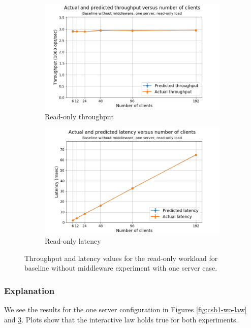 \documentclass[11pt,a4paper]{article}
\begin{document}
\begin{figure}[h]
\centering
\begin{subfigure}{.5\textwidth}
  \centering
  \includegraphics[width=1.0\linewidth,trim={20px 0px 35px 0px},clip]{img/plot/csb1-ro-law_tpt.png}
  \caption{Read-only throughput}
  \label{fig:csb1-ro-law_tpt}
\end{subfigure}%
\begin{subfigure}{.5\textwidth}
  \centering
  \includegraphics[width=1.0\linewidth,trim={20px 0px 40px 0px},clip]{img/plot/csb1-ro-law_lat.png}
  \caption{Read-only latency}
  \label{fig:csb1-ro-law_lat}
\end{subfigure}
\caption{Throughput and latency values for the read-only workload for baseline without middleware experiment with one server case.}
\label{fig:csb1-ro-law}
\end{figure}

\subsubsection{Explanation} \label{sec:csb1-exp}
We see the results for the one server configuration in Figures \ref{fig:csb1-wo-law} and \ref{fig:csb1-ro-law}. Plots show that the interactive law holds true for both experiments.
\end{document}
